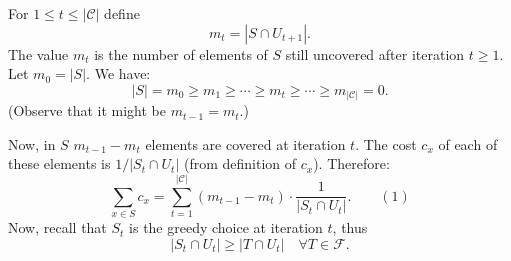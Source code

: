 For $1\leq t\leq|\mathcal C|$ define
\[m_t=|S\cap U_{t+1}|.\]
The value $m_t$ is the number of elements of $S$ still uncovered after iteration $t\geq1$.
Let $m_0=|S|$. We have:
\[|S|=m_0\geq m_1\geq\cdots\geq m_t\geq\cdots\geq m_{|\mathcal C|}=0.\]
(Observe that it might be $m_{t-1}=m_t$.)

Now, in $S$ $m_{t-1}-m_t$ elements are covered at iteration $t$. The cost $c_x$ of each of these elements is $1/|S_t\cap U_t|$ (from definition of $c_x$).
Therefore:
\[\sum_{x\in S}c_x=\sum_{t=1}^{|\mathcal C|}(m_{t-1}-m_t)\cdot\frac1{|S_t\cap U_t|}.\qquad(1)\]
Now, recall that $S_t$ is the greedy choice at iteration $t$, thus
\[|S_t\cap U_t|\geq|T\cap U_t|\quad\forall T\in\mathcal F.\]
